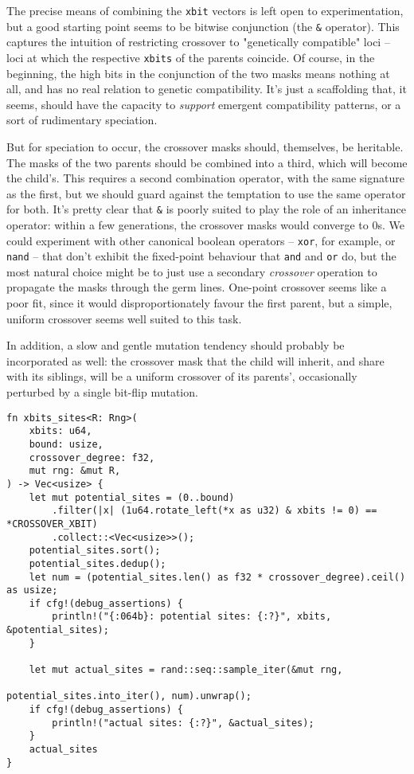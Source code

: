 \documentclass[11pt]{article}
\begin{document}
The precise means of combining the \texttt{xbit} vectors is left open to
experimentation, but a good starting point seems to be bitwise conjunction (the
\texttt{\&} operator). This captures the intuition of restricting crossover to
"genetically compatible" loci -- loci at which the respective \texttt{xbits} of the
parents coincide. Of course, in the beginning, the high bits in the conjunction
of the two masks means nothing at all, and has no real relation to genetic
compatibility. It's just a scaffolding that, it seems, should have the capacity
to \emph{support} emergent compatibility patterns, or a sort of rudimentary
speciation.

But for speciation to occur, the crossover masks should, themselves, be
heritable. The masks of the two parents should be combined into a third,
which will become the child's. This requires a second combination operator,
with the same signature as the first, but we should guard against the
temptation to use the same operator for both. It's pretty clear that \texttt{\&}
is poorly suited to play the role of an inheritance operator: within a
few generations, the crossover masks would converge to 0s. We could
experiment with other canonical boolean operators -- \texttt{xor}, for example,
or \texttt{nand} -- that don't exhibit the fixed-point behaviour that \texttt{and} and
\texttt{or} do, but the most natural choice might be to just use a secondary
\emph{crossover} operation to propagate the masks through the germ lines.
One-point crossover seems like a poor fit, since it would disproportionately
favour the first parent, but a simple, uniform crossover seems well
suited to this task.

In addition, a slow and gentle mutation tendency should probably be 
incorporated as well: the crossover mask that the child will inherit,
and share with its siblings, will be a uniform crossover of its
parents', occasionally perturbed by a single bit-flip mutation.



\lstset{language=rust,label=org04aecf7,caption= ,captionpos=b,numbers=none}
\begin{lstlisting}
fn xbits_sites<R: Rng>(
    xbits: u64,
    bound: usize,
    crossover_degree: f32,
    mut rng: &mut R,
) -> Vec<usize> {
    let mut potential_sites = (0..bound)
        .filter(|x| (1u64.rotate_left(*x as u32) & xbits != 0) == *CROSSOVER_XBIT)
        .collect::<Vec<usize>>();
    potential_sites.sort();
    potential_sites.dedup();
    let num = (potential_sites.len() as f32 * crossover_degree).ceil() as usize;
    if cfg!(debug_assertions) {
        println!("{:064b}: potential sites: {:?}", xbits, &potential_sites);
    }

    let mut actual_sites = rand::seq::sample_iter(&mut rng,
                                                  potential_sites.into_iter(), num).unwrap();
    if cfg!(debug_assertions) {
        println!("actual sites: {:?}", &actual_sites);
    }
    actual_sites
}
\end{lstlisting}
\end{document}

